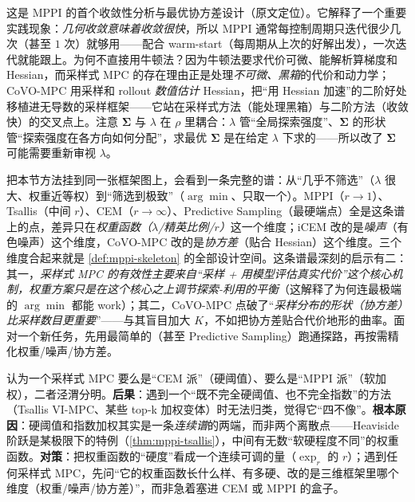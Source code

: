 \noindent 这是 MPPI 的首个收敛性分析与最优协方差设计（原文定位\cite{yi2024covo}）。它解释了一个重要实践现象：\emph{几何收敛意味着收敛很快}，所以 MPPI 通常每控制周期只迭代很少几次（甚至 $1$ 次）就够用——配合 warm-start（每周期从上次的好解出发），一次迭代就能跟上。为何不直接用牛顿法？因为牛顿法要求代价可微、能解析算梯度和 Hessian，而采样式 MPC 的存在理由正是处理\emph{不可微、黑箱}的代价和动力学；CoVO-MPC 用采样和 rollout \emph{数值估计} Hessian，把“用 Hessian 加速”的二阶好处移植进无导数的采样框架——它站在采样式方法（能处理黑箱）与二阶方法（收敛快）的交叉点上。注意 $\boldsymbol{\Sigma}$ 与 $\lambda$ 在 $\rho$ 里耦合：$\lambda$ 管“全局探索强度”、$\boldsymbol{\Sigma}$ 的形状管“探索强度在各方向如何分配”，求最优 $\boldsymbol{\Sigma}$ 是在给定 $\lambda$ 下求的——所以改了 $\boldsymbol{\Sigma}$ 可能需要重新审视 $\lambda$。

\begin{insight}
把本节方法挂到同一张框架图上，会看到一条完整的谱：从“几乎不筛选”（$\lambda$ 很大、权重近等权）到“筛选到极致”（$\arg\min$、只取一个）。MPPI（$r\to1$）、Tsallis（中间 $r$）、CEM（$r\to\infty$）、Predictive Sampling（最硬端点）全是这条谱上的点，差异只在\emph{权重函数（$\lambda$/精英比例/$r$）}这一个维度；iCEM 改的是\emph{噪声}（有色噪声）这个维度，CoVO-MPC 改的是\emph{协方差}（贴合 Hessian）这个维度。三个维度合起来就是 \cref{def:mppi-skeleton} 的全部设计空间。这条谱最深刻的启示有二：其一，\emph{采样式 MPC 的有效性主要来自“采样 + 用模型评估真实代价”这个核心机制，权重方案只是在这个核心之上调节探索-利用的平衡}（这解释了为何连最极端的 $\arg\min$ 都能 work）；其二，CoVO-MPC 点破了“\emph{采样分布的形状（协方差）比采样数目更重要}”——与其盲目加大 $K$，不如把协方差贴合代价地形的曲率。面对一个新任务，先用最简单的（甚至 Predictive Sampling）跑通探路，再按需精化权重/噪声/协方差。
\end{insight}

\begin{pitfall}
认为一个采样式 MPC 要么是“CEM 派”（硬阈值）、要么是“MPPI 派”（软加权），二者泾渭分明。\textbf{后果}：遇到一个“既不完全硬阈值、也不完全指数”的方法（Tsallis VI-MPC、某些 top-k 加权变体）时无法归类，觉得它“四不像”。\textbf{根本原因}：硬阈值和指数加权其实是一条\emph{连续谱}的两端，而非两个离散点——Heaviside 阶跃是某极限下的特例（\cref{thm:mppi-tsallis}），中间有无数“软硬程度不同”的权重函数。\textbf{对策}：把权重函数的“硬度”看成一个连续可调的量（$\exp_r$ 的 $r$）；遇到任何采样式 MPC，先问“它的权重函数长什么样、有多硬、改的是三维框架里哪个维度（权重/噪声/协方差）”，而非急着塞进 CEM 或 MPPI 的盒子。
\end{pitfall}

